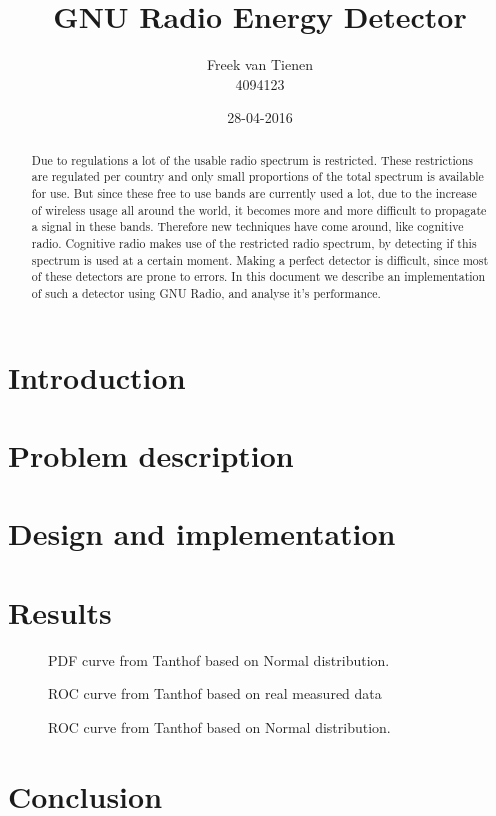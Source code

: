 \documentclass[]{article}
\begin{document}


\title{GNU Radio Energy Detector}
\author{Freek van Tienen \\ 4094123}
\date{28-04-2016}
\maketitle

\begin{abstract}
Due to regulations a lot of the usable radio spectrum is restricted.
These restrictions are regulated per country and only small proportions of the total spectrum is available for use.
But since these free to use bands are currently used a lot, due to the increase of wireless usage all around the world, it becomes more  and more difficult to propagate a signal in these bands.
Therefore new techniques have come around, like cognitive radio.
Cognitive radio makes use of the restricted radio spectrum, by detecting if this spectrum is used at a certain moment.
Making a perfect detector is difficult, since most of these detectors are prone to errors.
In this document we describe an implementation of such a detector using GNU Radio, and analyse it's performance.
\end{abstract}

\section{Introduction}

\section{Problem description}

\section{Design and implementation}

\section{Results}

\begin{figure}
    
    \caption{PDF curve from Tanthof based on Normal distribution.\label{fig:pdf_tant_norm}}
\end{figure}

\begin{figure}
    
    \caption{ROC curve from Tanthof based on real measured data\label{fig:roc_tant_real}}
\end{figure}

\begin{figure}
    
    \caption{ROC curve from Tanthof based on Normal distribution.\label{fig:roc_tant_norm}}
\end{figure}

\section{Conclusion}


\end{document}
